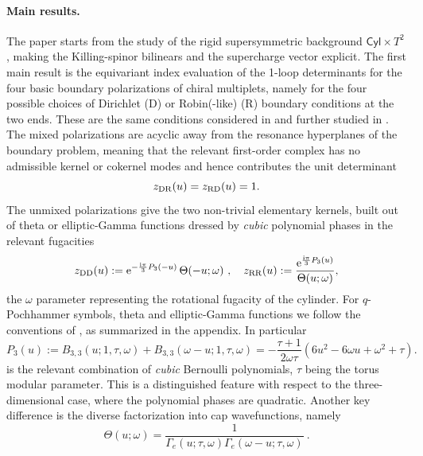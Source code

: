 \documentclass[11pt,a4paper]{article}
\numberwithin{equation}{section}
\theoremstyle{plain}
\theoremstyle{definition}
\theoremstyle{remark}
\newcommand{\ii}{\mathrm{i}}
\newcommand{\cyl}{\mathsf{Cyl}}
\begin{document}

\paragraph{Main results.}

The paper starts from the study of the rigid supersymmetric background \mbox{\(\cyl\times T^2\)}, making the Killing-spinor bilinears and the supercharge vector explicit. The first main result is the equivariant index evaluation of the 1-loop determinants for the four basic boundary polarizations of chiral multiplets, namely for the four possible choices of Dirichlet (D) or Robin(-like) (R) boundary conditions at the two ends. These are the same conditions considered in \cite{Longhi:2019hdh} and further studied in \cite{Dedushenko:2023cvd}. The mixed polarizations are acyclic away from the resonance hyperplanes of the boundary problem, meaning that the relevant first-order complex has no admissible kernel or cokernel modes and hence contributes the unit determinant
\begin{equation}
z_{\rm DR}(u)=z_{\rm RD}(u)=1 .
\label{eq:intro-zDR-RD-block}
\end{equation}
The unmixed polarizations give the two non-trivial elementary kernels, built out of theta or elliptic-Gamma functions dressed by \textit{cubic} polynomial phases in the relevant fugacities
\begin{equation}
z_{\rm DD}(u)
:=
\text{e}^{-\frac{\ii\pi}{3} P_3(-u)}\,
\Theta(-u;\omega)~,\quad z_{\rm RR}(u)
:=
\frac{
\text{e}^{\frac{\ii\pi}{3} P_3(u)}
}{
\Theta(u;\omega)
},
\end{equation}
the $\omega$ parameter representing the rotational fugacity of the cylinder. For $q$-Pochhammer symbols, theta and elliptic-Gamma functions we follow the  conventions of \cite{Felder:1999mq,Narukawa:2003,Friedman:2004}, as summarized in the appendix. In particular
\begin{equation}
P_3(u) :=B_{3,3}(u;1,\tau,\omega)+B_{3,3}(\omega-u;1,\tau,\omega) = -\frac{\tau+1}{2\omega\tau}\left(6u^2-6\omega u+\omega^2+\tau\right).
\label{eq:intro-theta-P3-def}
\end{equation}
is the relevant combination of \textit{cubic} Bernoulli polynomials, $\tau$ being the torus modular parameter. This is a distinguished feature with respect to the three-dimensional case, where the polynomial phases are quadratic. Another key difference is the diverse factorization into cap wavefunctions, namely
\begin{equation}
\Theta(u;\omega)=\frac{1}{\Gamma_e(u;\tau,\omega)\Gamma_e(\omega-u;\tau,\omega)}~.
\end{equation}
 
\end{document}
